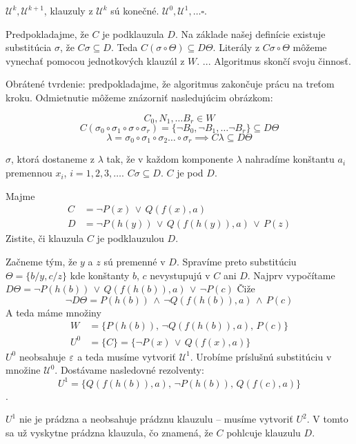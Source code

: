 \startFIXME

\begin{poznamka}
    $\mathcal{U}^k, \mathcal{U}^{k+1}$, klauzuly z
    $\mathcal{U}^{k}$ sú konečné. $\mathcal{U}^0, \mathcal{U}^1, \ldots \square$.
\end{poznamka}

\begin{dokaz}
    Predpokladajme, že $C$ je podklauzula $D$. Na základe našej
    definície existuje substitúcia $\sigma$, že $C\sigma \subseteq D$. Teda
    $C(\sigma \circ \Theta) \subseteq D\Theta$. Literály z $C\sigma \circ \Theta$
    môžeme vynechať pomocou jednotkových klauzúl z $W$. ... Algoritmus skončí svoju
    činnosť.
    \par
    Obrátené tvrdenie: predpokladajme, že algoritmus zakončuje prácu na treťom
    kroku. Odmietnutie môžeme znázorniť nasledujúcim obrázkom:


    $$C_0, N_1 ,\ldots B_r \in W$$
    $$C(\sigma_0 \circ \sigma_1 \circ \sigma \circ \sigma_r) = \{ \neg B_0, \neg
    B_1, \ldots \neg B_r\} \subseteq D\Theta$$
    $$\lambda = \sigma_0 \circ \sigma_1 \circ \sigma_2 \ldots \circ \sigma_r \implies
    C \lambda \subseteq D\Theta$$

    $\sigma$, ktorá dostaneme z $\lambda$ tak, že v každom komponente $\lambda$
    nahradíme  konštantu $a_i$ premennou $x_i$, $i=1, 2, 3, \ldots$. $C\sigma
    \subseteq D$. $C$ je pod $D$.
\end{dokaz}

\begin{priklad}
    Majme
    \begin{align*}
      C &= \neg P(x) \,\lor\, Q(f(x),a) \\
      D &= \neg P(h(y)) \,\lor\, Q(f(h(y)),a) \,\lor\, P(z)
    \end{align*}
    Zistite, či klauzula $C$ je podklauzulou $D$.

    Začneme tým, že $y$ a $z$ sú premenné v $D$. Spravíme preto substitúciu
    $\Theta = \{ b/y, c/z\}$ kde konštanty $b$, $c$
    nevystupujú v $C$ ani $D$. Najprv vypočítame
    $D\Theta = \neg P(h(b)) \,\lor\, Q(f(h(b)),a) \,\lor\, \neg P(c)$
    Čiže
    $$\neg D \Theta = P(h(b)) \,\land\, \neg Q(f(h(b)),a) \,\land\, P(c)$$
    A teda máme množiny
    \begin{align*}
      W &= \{P(h(b)),\, \neg Q(f(h(b)),a),\, P(c) \} \\
      U^0 &= \{C\} = \{\neg P(x) \,\lor\, Q(f(x),a)\}
    \end{align*}
    $U^0$ neobsahuje $\varepsilon$ a teda musíme vytvoriť $\mathcal{U}^1$. Urobíme
    príslušnú substitúciu v množine $\mathcal{U}^0$. Dostávame nasledovné rezolventy:
    $$U^1 = \{ Q(f(h(b)),a),\, \neg P(h(b)),\, Q(f(c),a)\}$$. 
    \par
    $U^1$
    nie je prádzna a neobsahuje prádznu klauzulu -- musíme vytvoriť $U^2$.
    V tomto sa už vyskytne prádzna klauzula, čo znamená, že $C$ pohlcuje klauzulu
    $D$.
\end{priklad}

